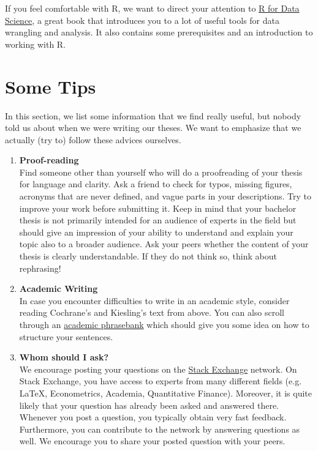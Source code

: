 \documentclass[a4paper, 12pt]{article}
\begin{document}
	If you feel comfortable with R, we want to direct your attention to \href{http://r4ds.had.co.nz/}{R for Data Science}, a great book that introduces you to a lot of useful tools for data wrangling and analysis. It also contains some prerequisites and an introduction to working with R.
       		
	\section{Some Tips}\label{sec:faqs}
	
	In this section, we list some information that we find really useful, but nobody told us about when we were writing our theses. We want to emphasize that we actually (try to) follow these advices ourselves.
		
	\begin{enumerate}
		\item \textbf{Proof-reading} \\
		Find someone other than yourself who will do a proofreading of your thesis for language and clarity. Ask a friend to check for typos, missing figures, acronyms that are never defined, and vague parts in your descriptions. Try to improve your work before submitting it. Keep in mind that your bachelor thesis is not primarily intended for an audience of experts in the field but should give an impression of your ability to understand and explain your topic also to a broader audience. Ask your peers whether the content of your thesis is clearly understandable. If they do not think so, think about rephrasing!
		
		\item \textbf{Academic Writing} \\
		In case you encounter difficulties to write in an academic style, consider reading Cochrane's and Kiesling's text from above. You can also scroll through an \href{http://www.phrasebank.manchester.ac.uk/}{academic phrasebank} which should give you some idea on how to structure your sentences.
			
		\item \textbf{Whom should I ask?} \\
		We encourage posting your questions on the \href{http://stackexchange.com/}{Stack Exchange} network. On Stack Exchange, you have access to experts from many different fields (e.g. \LaTeX, Econometrics, Academia, Quantitative Finance). Moreover, it is quite likely that your question has already been asked and answered there. Whenever you post a question, you typically obtain very fast feedback. Furthermore, you can contribute to the network by answering questions as well. We encourage you to share your posted question with your peers. 
		

\end{enumerate}
\end{document}

